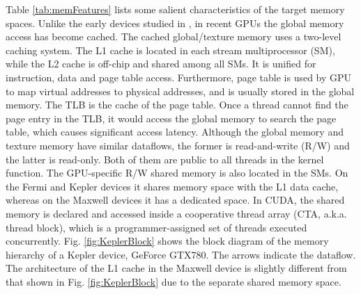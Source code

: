 \documentclass[10pt,journal,compsoc]{IEEEtran}
\theoremstyle{definition}
\begin{document}
Table \ref{tab:memFeatures} lists some salient characteristics of the target memory spaces. Unlike the early devices studied in \cite{wong2010demystifying}, in recent GPUs the global memory access has become cached. The cached global/texture memory uses a two-level caching system. The L1 cache is located in each stream multiprocessor (SM), while the L2 cache is off-chip and shared among all SMs. It is unified for instruction, data and page table access. Furthermore, page table is used by GPU to map virtual addresses to physical addresses, and is usually stored in the global memory. The TLB is the cache of the page table. Once a thread cannot find the page entry in the TLB, it would access the global memory to search the page table, which causes significant access latency. Although the global memory and texture memory have similar dataflows, the former is read-and-write (R/W) and the latter is read-only. Both of them are public to all threads in the kernel function. The GPU-specific R/W shared memory is also located in the SMs. On the Fermi and Kepler devices it shares memory space with the L1 data cache, whereas on the Maxwell devices it has a dedicated space. In CUDA, the shared memory is declared and accessed inside a cooperative thread array (CTA, a.k.a. thread block), which is a programmer-assigned set of threads executed concurrently. Fig. \ref{fig:KeplerBlock} shows the block diagram of the memory hierarchy of a Kepler device, GeForce GTX780. The arrows indicate the dataflow. The architecture of the L1 cache in the Maxwell device is slightly different from that shown in Fig. \ref{fig:KeplerBlock} due to the separate shared memory space.
\end{document}
